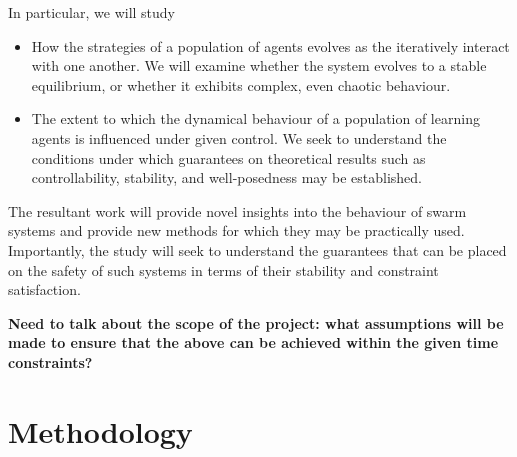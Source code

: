 \documentclass[.../main.tex]{subfiles}
\begin{document}
    In particular, we will study

    \begin{itemize}
    	\item How the strategies of a population of agents evolves as the iteratively interact
    	with one another. We will examine whether the system evolves to a stable equilibrium, or
    	whether it exhibits complex, even chaotic behaviour.
    	\item The extent to which the dynamical behaviour of a population of learning agents is
    	influenced under given control. We seek to understand the conditions under which guarantees
    	on theoretical results such as controllability, stability, and well-posedness may be
    	established.
    \end{itemize}

    The resultant work will provide novel insights into the behaviour of swarm systems and provide
    new methods for which they may be practically used. Importantly, the study will seek to
    understand the guarantees that can be placed on the safety of such systems in terms of their
    stability and constraint satisfaction.

    \textbf{Need to talk about the scope of the project: what assumptions will be made to ensure
    that the above can be achieved within the given time constraints?}

    \section{Methodology} \label{sec::Methodology}
\end{document}
